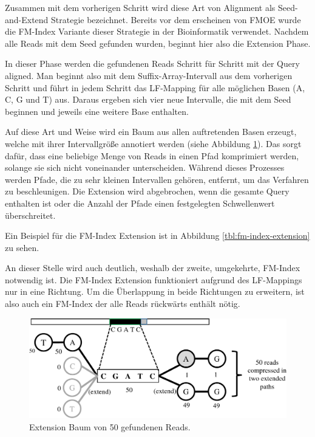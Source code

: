 Zusammen mit dem vorherigen Schritt wird diese Art von Alignment als Seed-and-Extend Strategie bezeichnet.
Bereits vor dem erscheinen von FMOE wurde die FM-Index Variante dieser Strategie in der Bioinformatik verwendet.
Nachdem alle Reads mit dem Seed gefunden wurden, beginnt hier also die Extension Phase.

In dieser Phase werden die gefundenen Reads Schritt für Schritt mit der Query aligned.
Man beginnt also mit dem Suffix-Array-Intervall aus dem vorherigen Schritt und führt in jedem Schritt das LF-Mapping für alle möglichen Basen (A, C, G und T) aus.
Daraus ergeben sich vier neue Intervalle, die mit dem Seed beginnen und jeweils eine weitere Base enthalten.

Auf diese Art und Weise wird ein Baum aus allen auftretenden Basen erzeugt, welche mit ihrer Intervallgröße annotiert werden (siehe Abbildung \ref{fig:extension}).
Das sorgt dafür, dass eine beliebige Menge von Reads in einen Pfad komprimiert werden, solange sie sich nicht voneinander unterscheiden.
Während dieses Prozesses werden Pfade, die zu sehr kleinen Intervallen gehören, entfernt, um das Verfahren zu beschleunigen.
Die Extension wird abgebrochen, wenn die gesamte Query enthalten ist oder die Anzahl der Pfade einen festgelegten Schwellenwert überschreitet.

Ein Beispiel für die FM-Index Extension ist in Abbildung \ref{tbl:fm-index-extension} zu sehen.

An dieser Stelle wird auch deutlich, weshalb der zweite, umgekehrte, FM-Index notwendig ist.
Die FM-Index Extension funktioniert aufgrund des LF-Mappings nur in eine Richtung. Um die Überlappung in beide Richtungen zu erweitern, ist also auch ein FM-Index der alle Reads rückwärts enthält nötig.

\begin{figure}[h]
	\begin{center}
		\includegraphics[]{./img/extension.png}
	\end{center}
	\caption{Extension Baum von 50 gefundenen Reads.}
	\label{fig:extension}
\end{figure}


